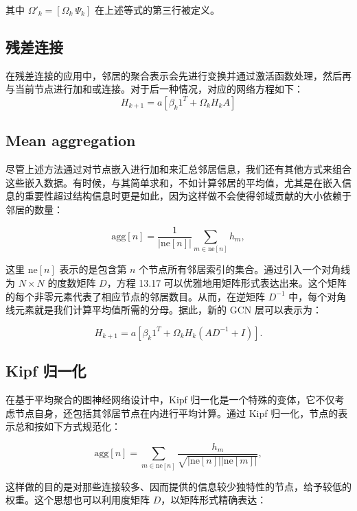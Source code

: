 其中 \(\Omega'_k = \left[ \Omega_k \ \Psi_k \right]\) 在上述等式的第三行被定义。

\subsection{残差连接}
在残差连接的应用中，邻居的聚合表示会先进行变换并通过激活函数处理，然后再与当前节点进行加和或连接。对于后一种情况，对应的网络方程如下：
\begin{equation}
H_{k+1} = a \left[ \beta_k 1^T + \Omega_k H_k A \right] 
\end{equation}
\subsection{Mean aggregation}
尽管上述方法通过对节点嵌入进行加和来汇总邻居信息，我们还有其他方式来组合这些嵌入数据。有时候，与其简单求和，不如计算邻居的平均值，尤其是在嵌入信息的重要性超过结构信息时更是如此，因为这样做不会使得邻域贡献的大小依赖于邻居的数量：

\begin{equation}
\text{agg}[n] = \frac{1}{|\text{ne}[n]|} \sum_{m \in \text{ne}[n]} h_m, 
\end{equation}

这里 \(\text{ne}[n]\) 表示的是包含第 \(n\) 个节点所有邻居索引的集合。通过引入一个对角线为 \(N \times N\) 的度数矩阵 \(D\)，方程 13.17 可以优雅地用矩阵形式表达出来。这个矩阵的每个非零元素代表了相应节点的邻居数目。从而，在逆矩阵 \(D^{-1}\) 中，每个对角线元素就是我们计算平均值所需的分母。据此，新的 GCN 层可以表示为：

\begin{equation}
H_{k+1} = a \left[ \beta_k 1^T + \Omega_k H_k (AD^{-1} + I) \right]. 
\end{equation}
\subsection{Kipf 归一化}
在基于平均聚合的图神经网络设计中，Kipf 归一化是一个特殊的变体，它不仅考虑节点自身，还包括其邻居节点在内进行平均计算。通过 Kipf 归一化，节点的表示总和按如下方式规范化：

\begin{equation}
\text{agg}[n] = \sum_{m \in \text{ne}[n]} \frac{h_m}{\sqrt{|\text{ne}[n]||\text{ne}[m]|}}, 
\end{equation}

这样做的目的是对那些连接较多、因而提供的信息较少独特性的节点，给予较低的权重。这个思想也可以利用度矩阵 \(D\)，以矩阵形式精确表达：

